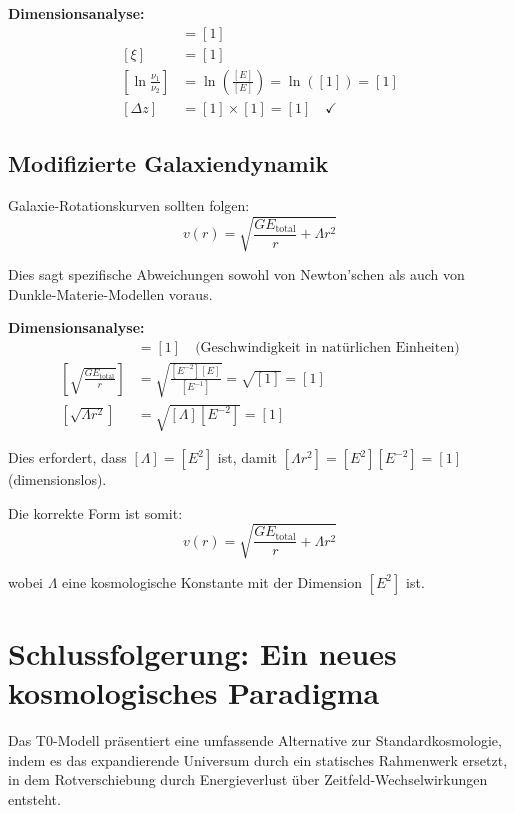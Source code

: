\documentclass[12pt,a4paper]{report}
\begin{document}
	\textbf{Dimensionsanalyse:}
	\begin{align}
		[\Delta z] &= [1] \\
		[\xi] &= [1] \\
		\left[\ln\frac{\nu_1}{\nu_2}\right] &= \ln\left(\frac{[E]}{[E]}\right) = \ln([1]) = [1] \\
		[\Delta z] &= [1] \times [1] = [1] \quad \checkmark
	\end{align}
	
\subsection{Modifizierte Galaxiendynamik}
\label{subsec:modified_galaxy_dynamics}

Galaxie-Rotationskurven sollten folgen:
\begin{equation}
	v(r) = \sqrt{\frac{GE_{\text{total}}}{r} + \Lambda r^2}
\end{equation}

Dies sagt spezifische Abweichungen sowohl von Newton'schen als auch von Dunkle-Materie-Modellen voraus.

\textbf{Dimensionsanalyse:}
\begin{align}
	[v(r)] &= [1] \quad \text{(Geschwindigkeit in natürlichen Einheiten)} \\
	\left[\sqrt{\frac{GE_{\text{total}}}{r}}\right] &= \sqrt{\frac{[E^{-2}][E]}{[E^{-1}]}} = \sqrt{[1]} = [1] \\
	[\sqrt{\Lambda r^2}] &= \sqrt{[\Lambda][E^{-2}]} = [1]
\end{align}

Dies erfordert, dass $[\Lambda] = [E^2]$ ist, damit $[\Lambda r^2] = [E^2][E^{-2}] = [1]$ (dimensionslos).

Die korrekte Form ist somit:
\begin{equation}
	v(r) = \sqrt{\frac{GE_{\text{total}}}{r} + \Lambda r^2}
\end{equation}

wobei $\Lambda$ eine kosmologische Konstante mit der Dimension $[E^2]$ ist.
	\section{Schlussfolgerung: Ein neues kosmologisches Paradigma}
	\label{sec:conclusion_cosmology}
	
	Das T0-Modell präsentiert eine umfassende Alternative zur Standardkosmologie, indem es das expandierende Universum durch ein statisches Rahmenwerk ersetzt, in dem Rotverschiebung durch Energieverlust über Zeitfeld-Wechselwirkungen entsteht.
	
\end{document}
